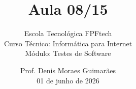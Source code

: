 
\title{Aula 08/15}

\subtitle{
\vspace{1.0cm}
Escola Tecnológica FPFtech\\
\vspace{0.5cm}
Curso Técnico: Informática para Internet\\
\vspace{0.5cm}
Módulo: Testes de Software
\vspace{1.0cm}
}

\author{
Prof. Denis Moraes Guimarães\\
\small 01 de junho de 2026
}

\date{}